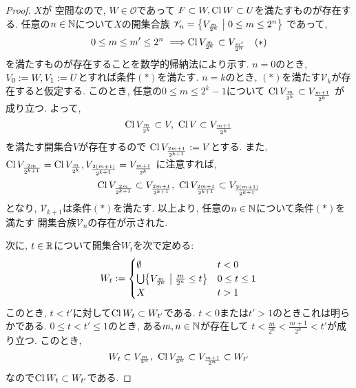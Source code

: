\documentclass[uplatex, dvipdfmx, a4paper, 12pt, class=jsbook, crop=false]{standalone}
\begin{document}
\begin{proof}
	\( X \)が  空間なので, \( W \in \mathcal{O} \)であって
	\( F \subset W, \mathop{\mathrm{Cl}}\nolimits W \subset U \)を満たすものが存在する.
	任意の\( n \in \mathbb{N} \)について\( X \)の開集合族
	\( \mathscr{V}_n = \setcomp{V_{\frac{m}{2^n}}}{0\leq m \leq 2^n} \)
	であって,
	\[ 0 \leq m \leq m' \leq 2^n \ \Longrightarrow
	\topcl V_{\frac{m}{2^n}} \subset V_{\frac{m'}{2^n}} \ \ \ (\ast) \]
	を満たすものが存在することを数学的帰納法により示す.
	\( n = 0 \)のとき, \( V_0 \mathrel{:=} W, V_1 \mathrel{:=} U \)とすれば条件\( (\ast) \)を満たす.
	\( n = k \)のとき, \( (\ast) \)を満たす\( \mathscr{V}_k \)が存在すると仮定する.
	このとき, 任意の\( 0 \leq m \leq 2^k - 1 \)について
	\( \mathop{\mathrm{Cl}}\nolimits V_{\frac{m}{2^k}} \subset V_{\frac{m+1}{2^k}} \)
	が成り立つ.
	よって,
	\[ \mathop{\mathrm{Cl}}\nolimits V_{\frac{m}{2^k}} \subset V, \
	\mathop{\mathrm{Cl}}\nolimits V \subset V_{\frac{m+1}{2^k}} \]
	を満たす開集合$ V $が存在するので
	\( \mathop{\mathrm{Cl}}\nolimits V_{\frac{2m+1}{2^{k+1}}} \mathrel{:=} V \)とする.
	また, \( \mathop{\mathrm{Cl}}\nolimits V_{\frac{2m}{2^{k+1}}} = \mathop{\mathrm{Cl}}\nolimits V_{\frac{m}{2^k}},
	V_{\frac{2(m+1)}{2^{k+1}}} = V_{\frac{m+1}{2^k}} \)
	に注意すれば,
	\[ \mathop{\mathrm{Cl}}\nolimits V_{\frac{2m}{2^{k+1}}} \subset V_{\frac{2m+1}{2^{k+1}}}, \
	\mathop{\mathrm{Cl}}\nolimits V_{\frac{2m+1}{2^{k+1}}} \subset V_{\frac{2(m+1)}{2^{k+1}}} \]
	となり, \( \mathscr{V}_{k+1} \)は条件\( (\ast) \)を満たす.
	以上より, 任意の\( n \in \mathbb{N} \)について条件\( (\ast) \)を満たす
	開集合族\( \mathscr{V}_n \)の存在が示された.

	次に, \( t \in \mathbb{R} \)について開集合\( W_t \)を次で定める:
	\[ W_t \defeq \begin{cases}
		\emptyset & t < 0 \\
		\bigcup \setcomp{V_{\frac{m}{2^n}}}{\frac{m}{2^n} \leq t} & 0 \leq t \leq 1 \\
		X & t > 1
	\end{cases}\]
	このとき, \( t < t' \)に対して\( \mathop{\mathrm{Cl}}\nolimits W_t \subset W_{t'} \)である.
	\( t < 0 \)または\( t' > 1 \)のときこれは明らかである.
	\( 0 \leq t < t' \leq 1 \)のとき,
	ある\( m, n \in \mathbb{N} \)が存在して
	\( t < \frac{m}{2^n} < \frac{m+1}{2^n} < t' \)が成り立つ.
	このとき, \[ W_t \subset V_{\frac{m}{2^n}}, \
	\mathop{\mathrm{Cl}}\nolimits V_{\frac{m}{2^n}} \subset V_{\frac{m+1}{2^n}} \subset W_{t'} \]
	なので\( \mathop{\mathrm{Cl}}\nolimits W_t \subset W_{t'} \)である.


\end{proof}
\end{document}
